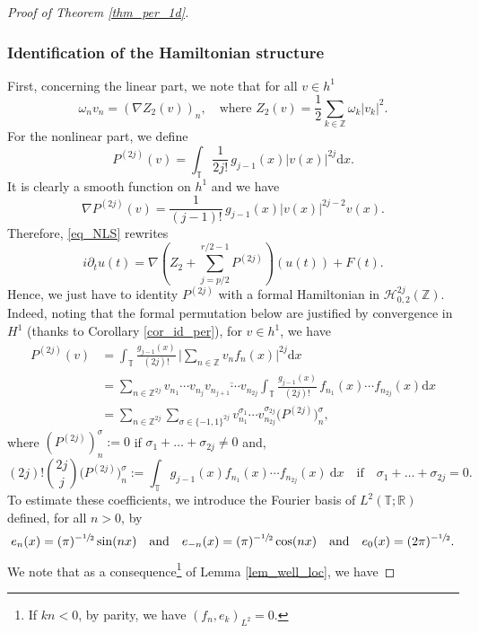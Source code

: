 \documentclass[JEP,XML,SOM,Unicode,NoEqCountersInSection,published]{cedram}
\theoremstyle{definition}
\begin{document}
\begin{proof}[Proof of Theorem \ref{thm_per_1d}]
\subsubsection*{Identification of the Hamiltonian structure}
First, concerning the linear part, we note that for all $v\in h^1$
\[
\omega_n v_n = (\nabla Z_2(v))_n,\quad \text{where } Z_2(v) = \frac12 \sum_{k\in \mathbb{Z}} \omega_k |v_k|^2.
\]
For the nonlinear part, we define
\[
P^{(2j)}(v)= \int_{\mathbb{T}} \frac1{2j!}\, g_{j-1}(x) |v(x)|^{2j} \mathrm{d}x.
\]
It is clearly a smooth function on $h^1$ and we have
\[
\nabla P^{(2j)}(v) = \frac1{(j-1)!}\, g_{j-1}(x) |v(x)|^{2j-2} v(x).
\]
Therefore, \eqref{eq_NLS} rewrites
\begin{equation}
\label{raclette_a_la_chevre}
i\partial_t u(t) = \nabla(Z_2 + \sum_{j=p/2}^{r/2-1} P^{(2j)})(u(t)) + F(t).
\end{equation}
Hence, we just have to identity $P^{(2j)}$ with a formal Hamiltonian in $\mathscr{H}_{0,2}^{2j}(\mathbb{Z})$. Indeed, noting that the formal permutation below are justified by convergence in $H^1$ (thanks to Corollary \ref{cor_id_per}), for $v\in h^1$, we have
\begin{equation*}
\begin{split}
\!\!\!\!\!\! P^{(2j)}(v) &= \int_{\mathbb{T}} \frac{g_{j-1}(x)}{(2j)!}\, \Big| \sum_{n \in \mathbb{Z}} v_n f_n(x) \Big|^{2j} \mathrm{d}x \\
&=\sum_{n \in \mathbb{Z}^{2j}} v_{n_1}\cdots v_{n_{j}} \overline{v_{n_{j+1}} \cdots v_{n_{2j}}} \int_{\mathbb{T}} \frac{g_{j-1}(x)}{(2j)!}\, f_{n_1}(x) \cdots f_{n_{2j}}(x) \mathrm{d}x \\
&= \sum_{n \in \mathbb{Z}^{2j}} \sum_{\sigma \in \{-1,1\}^{2j}} v_{n_1}^{\sigma_1}\cdots v_{n_{2j}}^{\sigma_{2j}} \bigl(P^{(2j)}\bigr)_n^\sigma,
\end{split}
\end{equation*}
where $(P^{(2j)})_n^\sigma:= 0$ if $\sigma_1+\dots+ \sigma_{2j}\neq 0$ and,
\[
(2j)! \binom{2j}{j} \bigl(P^{(2j)}\bigr)_n^\sigma:= \int_{\mathbb{T}} g_{j-1}(x) f_{n_1}(x) \cdots f_{n_{2j}}(x) \ \mathrm{d}x \quad \mathrm{if} \quad \sigma_1+\dots+ \sigma_{2j} = 0.
\]
To estimate these coefficients, we introduce the Fourier basis of $L^2(\mathbb{T};\mathbb{R})$ defined, for all $n>0$, by
\[
e_n(x)=(\pi)^{-\sfrac12}\sin(n x) \quad \text{and}\quad e_{-n}(x)=(\pi)^{-\sfrac12}\cos(n x) \quad \text{and}\quad e_0(x)=(2\pi)^{-\sfrac12}.
\]
We note that as a consequence\footnote{If $kn<0$, by parity, we have $(f_n,e_k)_{L^2}=0$.} of Lemma \ref{lem_well_loc}, we have

\end{proof}
\end{document}
